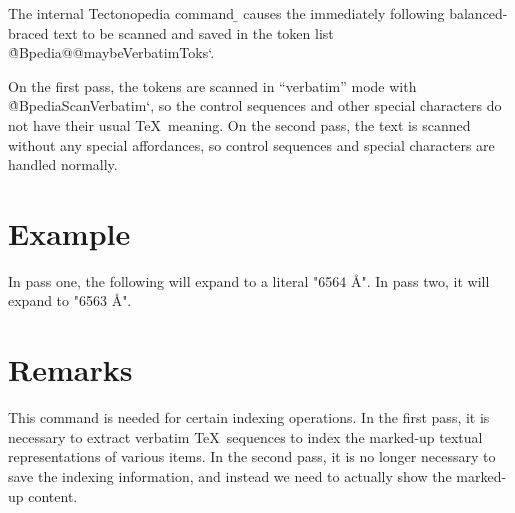 \tduxEmit %



The internal Tectonopedia command \b{\string\pediaPassOneVerbatim} causes the
immediately following balanced-braced text to be scanned and saved in the token
list \`@Bpedia@@maybeVerbatimToks`.

On the first pass, the tokens are scanned in “verbatim” mode with
\`@BpediaScanVerbatim`, so the control sequences and other special characters do
not have their usual \TeX\ meaning. On the second pass, the text is scanned
without any special affordances, so control sequences and special characters are
handled normally.

\section*{Example}

\begin{texdisp}
\pediaPassOneVerbatim{6563 \AA}
\makeatletter
In pass one, the following will expand to a literal "6564 \AA". In pass
two, it will expand to "6563 Å".
\the\pedia@maybeVerbatimToks
\makeatother
\end{texdisp}

\section*{Remarks}

This command is needed for certain indexing operations. In the first pass, it is
necessary to extract verbatim \TeX\ sequences to index the marked-up textual
representations of various items. In the second pass, it is no longer necessary
to save the indexing information, and instead we need to actually show the
marked-up content.